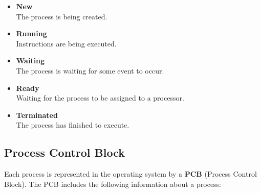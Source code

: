\documentclass{article}
\begin{document}
\begin{itemize}
	\item \textbf{New}
	\vspace{.2cm} \\
	The process is being created.
	
	\item \textbf{Running}
	\vspace{.2cm} \\
	Instructions are being executed.
	
	\item \textbf{Waiting}
	\vspace{.2cm} \\
	The process is waiting for some event to occur.
	
	\item \textbf{Ready}
	\vspace{.2cm} \\
	Waiting for the process to be assigned to a processor.
	
	\item \textbf{Terminated}
	\vspace{.2cm} \\
	The process has finished to execute.
\end{itemize}

\subsection{Process Control Block}
Each process is represented in the operating system by a \textbf{PCB} (Process Control Block). The PCB includes the following information about a process:
\end{document}
